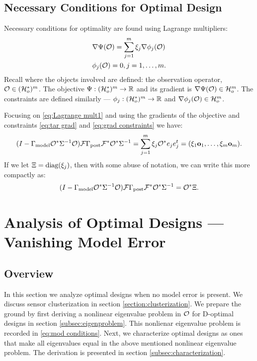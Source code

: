 \documentclass{amsart}
\numberwithin{equation}{section}
\begin{document}
\subsection{Necessary Conditions for Optimal Design}\label{subsec:necessary}
Necessary conditions for optimality are found using Lagrange
multipliers:
\begin{align}
  &\nabla \Psi(\mathcal{O}) = \sum_{j=1}^m \xi_j \nabla \phi_j (\mathcal{O})
  \label{eq:Lagrange mult1} \\
    &\phi_j(\mathcal{O}) = 0, j = 1,\dots,m. \label{eq:Lagrange mult2}
\end{align}
Recall where the objects involved are defined: the observation operator,
$\mathcal{O} \in (\mathcal{H}_o^*)^m$. The objective $\Psi:
(\mathcal{H}_o^*)^m \to \mathbb{R}$ and its gradient is $\nabla \Psi(\mathcal{O}) \in
\mathcal{H}_o^m$. The constraints are defined similarly --- $\phi_j: (\mathcal{H}_o^*)^m
\to \mathbb{R}$ and $\nabla \phi_j(\mathcal{O}) \in \mathcal{H}_o^m$.

Focusing on \eqref{eq:Lagrange mult1} and using the gradients of the
objective and constraints \eqref{eq:tar grad} and \eqref{eq:grad
  constraints} we have:
\begin{equation*}
  (I - \Gamma_{\textup{model}} \mathcal{O}^* \Sigma^{-1} \mathcal{O}) \mathcal{F} \Gamma_{\textup{post}} \mathcal{F}^* \mathcal{O}^*\Sigma^{-1}
  = \sum_{j=1}^m \xi_j \mathcal{O}^* e_je_j^t = (\xi_1 \mathbf{o}_1,\dots,\xi_m \mathbf{o}_m).
\end{equation*}
If we let $\Xi = \textup{diag}(\xi_j)$, then with some abuse of
notation, we can write this more compactly as:
\begin{equation}\label{eq:conditions}
  ( I - \Gamma_{\textup{model}} \mathcal{O}^* \Sigma^{-1} \mathcal{O}) \mathcal{F} \Gamma_{\textup{post}} \mathcal{F}^* \mathcal{O}^*  \Sigma^{-1}
  = \mathcal{O}^* \Xi.
\end{equation}






\section{Analysis of Optimal Designs --- Vanishing Model Error}\label{section:vanishing}
\subsection{Overview}
In this section we analyze optimal designs when no model error is
present. We discuss sensor clusterization in section
\ref{section:clusterization}. We prepare the ground by first deriving
a nonlinear eigenvalue problem in $\mathcal{O}$ for D-optimal designs in
section \ref{subsec:eigenproblem}. This nonlienar eigenvalue problem
is recorded in \eqref{eq:mod conditions}. Next, we characterize
optimal designs as ones that make all eigenvalues equal in the above
mentioned nonlinear eigenvalue problem. The derivation is presented in
section \ref{subsec:characterization}.
\end{document}
